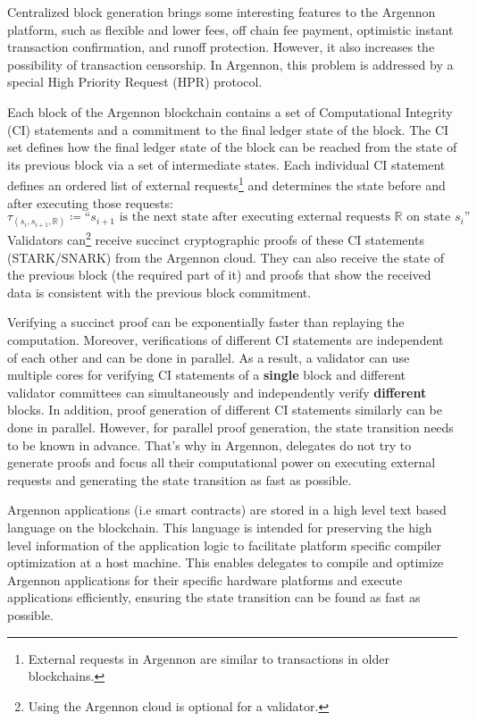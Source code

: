 Centralized block generation brings some interesting features to the Argennon platform, such as flexible and lower
fees, off chain fee payment, optimistic instant transaction confirmation, and runoff protection.
However, it also increases the possibility of transaction censorship. In Argennon, this problem is addressed by a
special High Priority Request (HPR) protocol.

Each block of the Argennon blockchain contains a set of Computational Integrity (CI) statements and a commitment to
the final ledger state of the block. The CI set defines how the final ledger state of the block can be reached from
the state of its previous block via a set of intermediate states.
Each individual CI statement defines an ordered list of external requests\footnote{External requests in Argennon are
similar to transactions in older blockchains.} and determines the state before and after executing those requests:
\[
    \tau_{(s_i,s_{i+1},\mathbb{R})} \coloneqq \text{``$s_{i+1}$ is the next state after executing external requests
        $\mathbb{R}$ on state $s_i$''}
\]
Validators can\footnote{Using the Argennon cloud is optional for a validator.} receive succinct cryptographic proofs
of these CI statements (STARK/SNARK) from the Argennon cloud. They can also receive the state of the previous
block (the required part of it) and proofs that show the received data is consistent with the previous block commitment.

Verifying a succinct proof can be exponentially faster than replaying the computation. Moreover, verifications of
different CI statements are independent of each other and can be done in parallel. As a result, a validator can use
multiple cores for verifying CI statements of a \textbf{single} block and different validator committees can
simultaneously and
independently verify \textbf{different} blocks.
In addition, proof generation of different CI statements similarly can be done in parallel. However, for parallel
proof generation, the state transition needs to be known in advance. That's why in Argennon, delegates do not try
to generate proofs and focus all their computational power on executing external requests and
generating the state transition as fast as possible.

Argennon applications (i.e smart contracts) are stored in a high level text based language on the blockchain. This
language is intended for preserving the
high level information of the application logic to facilitate platform specific compiler optimization at a host
machine. This enables delegates to compile and optimize Argennon applications for their specific hardware platforms
and execute applications efficiently, ensuring the state transition can be found as fast as possible.

